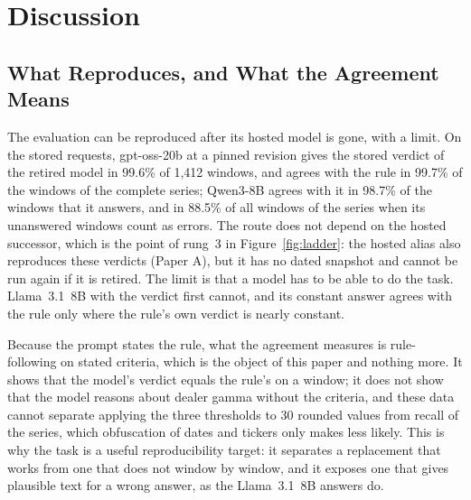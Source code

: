 \section{Discussion}
\label{sec:discussion}

\subsection{What Reproduces, and What the Agreement Means}
\label{sec:discussion:what}

The evaluation can be reproduced after its hosted model is gone, with a limit. On the stored requests, gpt-oss-20b at a pinned revision gives the stored verdict of the retired model in 99.6\% of 1{,}412 windows, and agrees with the rule in 99.7\% of the windows of the complete series; Qwen3-8B agrees with it in 98.7\% of the windows that it answers, and in 88.5\% of all windows of the series when its unanswered windows count as errors. The route does not depend on the hosted successor, which is the point of rung~3 in Figure~\ref{fig:ladder}: the hosted alias also reproduces these verdicts (Paper A), but it has no dated snapshot and cannot be run again if it is retired. The limit is that a model has to be able to do the task. Llama~3.1~8B with the verdict first cannot, and its constant answer agrees with the rule only where the rule's own verdict is nearly constant.

Because the prompt states the rule, what the agreement measures is rule-following on stated criteria, which is the object of this paper and nothing more. It shows that the model's verdict equals the rule's on a window; it does not show that the model reasons about dealer gamma without the criteria, and these data cannot separate applying the three thresholds to 30 rounded values from recall of the series, which obfuscation of dates and tickers only makes less likely. This is why the task is a useful reproducibility target: it separates a replacement that works from one that does not window by window, and it exposes one that gives plausible text for a wrong answer, as the Llama~3.1~8B answers do.

